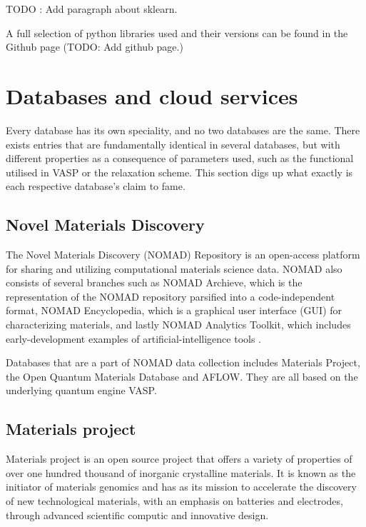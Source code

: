 TODO : Add paragraph about sklearn.

A full selection of python libraries used and their versions can be found in the Github page (TODO: Add github page.)

\section{Databases and cloud services}

Every database has its own speciality, and no two databases are the same. There exists entries that are fundamentally identical in several databases, but with different properties as a consequence of parameters used, such as the functional utilised in VASP or the relaxation scheme. This section digs up what exactly is each respective database's claim to fame.

\subsection{Novel Materials Discovery}

The Novel Materials Discovery (NOMAD) \cite{Draxl2019} Repository is an open-access platform for sharing and utilizing computational materials science data. NOMAD also consists of several branches such as NOMAD Archieve, which is the representation of the NOMAD repository parsified into a code-independent format, NOMAD Encyclopedia, which is a graphical user interface (GUI) for characterizing materials, and lastly NOMAD Analytics Toolkit, which includes early-development examples of artificial-intelligence tools \cite{Draxl2019}.

Databases that are a part of NOMAD data collection includes Materials Project, the Open Quantum Materials Database and AFLOW. They are all based on the underlying quantum engine VASP.

\subsection{Materials project}

Materials project \cite{Jain2013} is an open source project that offers a variety of properties of over one hundred thousand of inorganic crystalline materials. It is known as the initiator of materials genomics and has as its mission to accelerate the discovery of new technological materials, with an emphasis on batteries and electrodes, through advanced scientific computic and innovative design.



